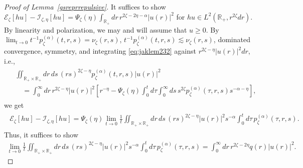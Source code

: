 \documentclass[12pt,reqno]{amsart}
\theoremstyle{definition}
\theoremstyle{remark}
\numberwithin{equation}{section}
\newcommand{\1}{\mathbbm{1}}
\newcommand{\R}{\mathbb{R}}
\def\ce{\mathcal{E}}
\def\ci{\mathcal{I}}
\begin{document}
\begin{proof}[Proof of Lemma~\ref{gsreprrepulsive}]
  It suffices to show $\ce_\zeta[hu]-\ci_{\zeta,\eta}[hu]=\Psi_\zeta(\eta)\int_{\R_+}dr\, r^{2\zeta-2\eta-\alpha}|u(r)|^2$ for $hu\in L^2(\R_+,r^{2\zeta}dr)$. By linearity and polarization, we may and will assume that $u\geq0$. By $\lim_{t\to0}t^{-1}p_\zeta^{(\alpha)}(t,r,s)=\nu_\zeta(r,s)$, $t^{-1}p_\zeta^{(\alpha)}(t,r,s)\lesssim\nu_\zeta(r,s)$, dominated convergence, symmetry,
  and integrating \eqref{eq:jaklem232} against $r^{2\zeta-\eta}|u(r)|^2dr$, i.e.,
  \begin{align}
    \begin{split}
      & \iint_{\R_+\times\R_+} dr\,ds\, (rs)^{2\zeta-\eta}p_\zeta^{(\alpha)}(t,r,s)|u(r)|^2 \\
      & \quad = \int_0^\infty dr\, r^{2\zeta-\eta}|u(r)|^2\left[r^{-\eta} - \Psi_\zeta(\eta)\int_0^t d\tau \int_0^\infty ds\, s^{2\zeta} p_\zeta^{(\alpha)}(\tau,r,s) s^{-\alpha-\eta}\right],
    \end{split}
  \end{align}
  we get
  \begin{align}
    \begin{split}
      \ce_\zeta[hu] - \ci_{\zeta,\eta}[hu]
      = \Psi_\zeta(\eta) \lim_{t\to0}\frac1t \iint_{\R_+\times\R_+}dr\,ds\, (rs)^{2\zeta-\eta}|u(r)|^2 s^{-\alpha} \int_0^t d\tau\, p_\zeta^{(\alpha)}(\tau,r,s).
    \end{split}
  \end{align}
  Thus, it suffices to show
  \begin{align}
    \label{eq:approximationidentityaveraged}
    \lim_{t\to0}\frac1t \iint_{\R_+\times\R_+}dr\,ds\, (rs)^{2\zeta-\eta}|u(r)|^2 s^{-\alpha} \int_0^t d\tau\, p_\zeta^{(\alpha)}(\tau,r,s)
    = \int_0^\infty dr\, r^{2\zeta-2\eta}q(r)|u(r)|^2.

\end{align}
\end{proof}
\end{document}

